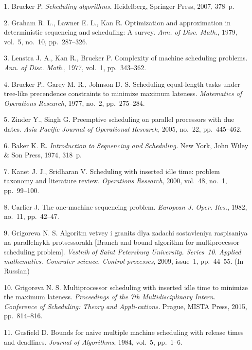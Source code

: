{\footnotesize

\vskip 4mm


\vskip 3mm


1. Brucker P. {\it Scheduling algorithms.} Heidelberg, Springer
Press, 2007, 378~p.


2. Graham R. L., Lawner E. L., Kan R. Optimization and
approximation in deterministic sequencing and scheduling: A
survey. {\it Ann. of Disc. Math.}, 1979, vol.~5, no.~10,
pp.~287--326.



3. Lenstra J. A., Kan R., Brucker P. Complexity of machine
scheduling problems. {\it Ann. of Disc. Math.}, 1977, vol.~1,
pp.~343--362.

4. Brucker P., Garey M. R., Johnson D. S. Scheduling equal-length
tasks under tree-like precendence constraints to minimize maximum
lateness. {\it  Matematics of Operations Research}, 1977, no.~2,
pp.~275--284.


5. Zinder Y., Singh G. Preemptive scheduling on parallel
processors with due dates. {\it Asia Pacific Journal of
Operational Research}, 2005, no.~22, pp.~445--462.

6. Baker K. R. {\it Introduction to Sequencing and Scheduling.}
New York, John Wiley \& Son Press,  1974, 318~p.


7. Kanet J. J., Sridharan V. Scheduling with inserted idle time:
problem taxonomy and literature review. {\it Operations Research},
2000, vol.~48, no.~1, pp.~99--100.

8. Carlier J. The one-machine sequencing problem. {\it  European
J. Oper. Res.}, 1982, no.~11, pp.~42--47.


9. Grigoreva N. S. Algoritm vetvey i granits dlya zadachi
sostavleniya raspisaniya na parallelnykh protsessorakh [Branch and
bound algorithm  for multiprocessor scheduling problem]. {\it
Vestnik of Saint Petersburg University. Series~10. Applied
mathematics.  Comruter science. Control processes}, 2009, issue~1,
pp.~44--55. (In Russian)

10. Grigoreva N. S.  Multiprocessor scheduling with inserted idle
time to minimize the maximum lateness. {\it Proceedings of the 7th
Multidisciplinary Intern. Conference of Scheduling: Theory and
Appli-\linebreak cations.} Prague, MISTA Press, 2015,
pp.~814--816.


11. Gusfield D. Bounds for naive multiple machine scheduling with
release times and deadlines. {\it Journal of Algorithms}, 1984,
vol.~5, pp.~1--6.


}
